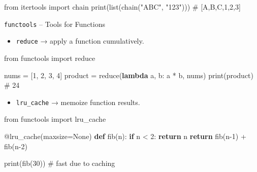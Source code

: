 \documentclass[
  letterpaper,
  DIV=11,
  numbers=noendperiod]{scrreprt}
\newenvironment{Shaded}{\begin{snugshade}}{\end{snugshade}}
\newcommand{\AttributeTok}[1]{\textcolor[rgb]{0.40,0.45,0.13}{#1}}
\newcommand{\BuiltInTok}[1]{\textcolor[rgb]{0.00,0.23,0.31}{#1}}
\newcommand{\CommentTok}[1]{\textcolor[rgb]{0.37,0.37,0.37}{#1}}
\newcommand{\ControlFlowTok}[1]{\textcolor[rgb]{0.00,0.23,0.31}{\textbf{#1}}}
\newcommand{\DecValTok}[1]{\textcolor[rgb]{0.68,0.00,0.00}{#1}}
\newcommand{\ImportTok}[1]{\textcolor[rgb]{0.00,0.46,0.62}{#1}}
\newcommand{\KeywordTok}[1]{\textcolor[rgb]{0.00,0.23,0.31}{\textbf{#1}}}
\newcommand{\NormalTok}[1]{\textcolor[rgb]{0.00,0.23,0.31}{#1}}
\newcommand{\OperatorTok}[1]{\textcolor[rgb]{0.37,0.37,0.37}{#1}}
\newcommand{\StringTok}[1]{\textcolor[rgb]{0.13,0.47,0.30}{#1}}
\newcommand{\VariableTok}[1]{\textcolor[rgb]{0.07,0.07,0.07}{#1}}
\providecommand{\tightlist}{%
  \setlength{\itemsep}{0pt}\setlength{\parskip}{0pt}}
\begin{document}
\begin{Shaded}
\begin{Highlighting}[]
\ImportTok{from}\NormalTok{ itertools }\ImportTok{import}\NormalTok{ chain}
\BuiltInTok{print}\NormalTok{(}\BuiltInTok{list}\NormalTok{(chain(}\StringTok{"ABC"}\NormalTok{, }\StringTok{"123"}\NormalTok{)))  }\CommentTok{\# [\textquotesingle{}A\textquotesingle{},\textquotesingle{}B\textquotesingle{},\textquotesingle{}C\textquotesingle{},\textquotesingle{}1\textquotesingle{},\textquotesingle{}2\textquotesingle{},\textquotesingle{}3\textquotesingle{}]}
\end{Highlighting}
\end{Shaded}

\texttt{functools} -- Tools for Functions

\begin{itemize}
\tightlist
\item
  \texttt{reduce} → apply a function cumulatively.
\end{itemize}

\begin{Shaded}
\begin{Highlighting}[]
\ImportTok{from}\NormalTok{ functools }\ImportTok{import} \BuiltInTok{reduce}

\NormalTok{nums }\OperatorTok{=}\NormalTok{ [}\DecValTok{1}\NormalTok{, }\DecValTok{2}\NormalTok{, }\DecValTok{3}\NormalTok{, }\DecValTok{4}\NormalTok{]}
\NormalTok{product }\OperatorTok{=} \BuiltInTok{reduce}\NormalTok{(}\KeywordTok{lambda}\NormalTok{ a, b: a }\OperatorTok{*}\NormalTok{ b, nums)}
\BuiltInTok{print}\NormalTok{(product)  }\CommentTok{\# 24}
\end{Highlighting}
\end{Shaded}

\begin{itemize}
\tightlist
\item
  \texttt{lru\_cache} → memoize function results.
\end{itemize}

\begin{Shaded}
\begin{Highlighting}[]
\ImportTok{from}\NormalTok{ functools }\ImportTok{import}\NormalTok{ lru\_cache}

\AttributeTok{@lru\_cache}\NormalTok{(maxsize}\OperatorTok{=}\VariableTok{None}\NormalTok{)}
\KeywordTok{def}\NormalTok{ fib(n):}
    \ControlFlowTok{if}\NormalTok{ n }\OperatorTok{\textless{}} \DecValTok{2}\NormalTok{:}
        \ControlFlowTok{return}\NormalTok{ n}
    \ControlFlowTok{return}\NormalTok{ fib(n}\OperatorTok{{-}}\DecValTok{1}\NormalTok{) }\OperatorTok{+}\NormalTok{ fib(n}\OperatorTok{{-}}\DecValTok{2}\NormalTok{)}

\BuiltInTok{print}\NormalTok{(fib(}\DecValTok{30}\NormalTok{))  }\CommentTok{\# fast due to caching}
\end{Highlighting}
\end{Shaded}
\end{document}
